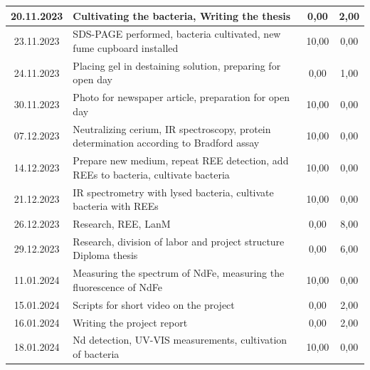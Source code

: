 \begin{longtable}{|c|p{7cm}|c|c|}
    20.11.2023    & Cultivating the bacteria, Writing the thesis                                                                    & 0,00                 & 2,00              \\ \hline
    23.11.2023    & SDS-PAGE performed, bacteria cultivated, new fume cupboard installed                                            & 10,00 & 0,00 \\ \hline
    24.11.2023    & Placing gel in destaining solution, preparing for open day                                                      & 0,00                 & 1,00              \\ \hline
    30.11.2023    & Photo for newspaper article, preparation for open day                                                           & 10,00                & 0,00              \\ \hline
    07.12.2023    & Neutralizing cerium, IR spectroscopy, protein determination according to Bradford assay & 10,00 & 0,00 \\ \hline
    14.12.2023    & Prepare new medium, repeat REE detection, add REEs to bacteria, cultivate bacteria & 10,00 & 0,00 \\ \hline
    21.12.2023    & IR spectrometry with lysed bacteria, cultivate bacteria with REEs                                               & 10,00 & 0,00 \\ \hline
    26.12.2023    & Research, REE, LanM                                                                                             & 0,00                 & 8,00              \\ \hline
    29.12.2023    & Research, division of labor and project structure Diploma thesis                                                & 0,00 & 6,00 \\ \hline
    11.01.2024    & Measuring the spectrum of NdFe, measuring the fluorescence of NdFe                                              & 10,00 & 0,00 \\ \hline
    15.01.2024    & Scripts for short video on the project                                                                          & 0,00                 & 2,00              \\ \hline
    16.01.2024    & Writing the project report                                                                                      & 0,00                 & 2,00              \\ \hline
    18.01.2024    & Nd detection, UV-VIS measurements, cultivation of bacteria                                                      & 10,00                & 0,00              \\ \hline

\end{longtable}
